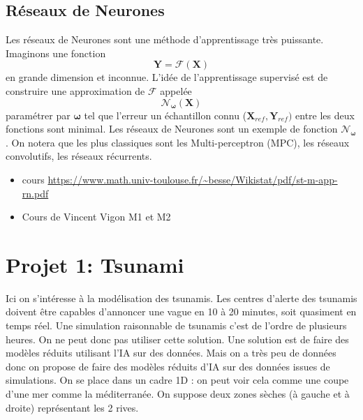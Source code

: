 \documentclass[11pt]{article}
\theoremstyle{definition}
\begin{document}
\subsection{Réseaux de Neurones}
Les réseaux de Neurones sont une méthode d'apprentissage très puissante. Imaginons une fonction
$$
\mathbf{Y} = \mathcal{F}(\mathbf{X})
$$
en grande dimension et inconnue. L'idée de l'apprentissage supervisé est de construire une approximation de $\mathcal{F}$ appelée
$$
\mathcal{N}_{\mathbf{\omega}}(\mathbf{X})
$$
paramétrer par $\mathbf{\omega}$ tel que l'erreur un échantillon connu ($\mathbf{X}_{ref},\mathbf{Y}_{ref})$ entre les deux fonctions sont minimal. Les réseaux de Neurones sont un exemple de fonction $\mathcal{N}_{\mathbf{\omega}}$. On notera que les plus classiques sont les Multi-perceptron (MPC), les réseaux convolutifs, les réseaux récurrents.
\begin{itemize}
\item cours \url{https://www.math.univ-toulouse.fr/~besse/Wikistat/pdf/st-m-app-rn.pdf}
\item Cours de Vincent Vigon M1 et M2
\end{itemize}
\section{Projet 1: Tsunami}
Ici on s'intéresse à la modélisation des tsunamis. Les centres d'alerte des tsunamis doivent être capables d'annoncer une vague en 10 à 20 minutes, soit quasiment en temps réel.  Une simulation raisonnable de tsunamis c'est de l'ordre de plusieurs heures. On ne peut donc pas utiliser cette solution. Une solution est de faire des modèles réduits utilisant l'IA sur des données. Mais on a très peu de données donc on propose de faire des modèles réduits d'IA sur des données issues de simulations. On se place dans un cadre 1D : on peut voir cela comme une coupe d'une mer comme la méditerranée. On suppose deux zones sèches (à gauche et à droite) représentant les 2 rives. 
\end{document}
